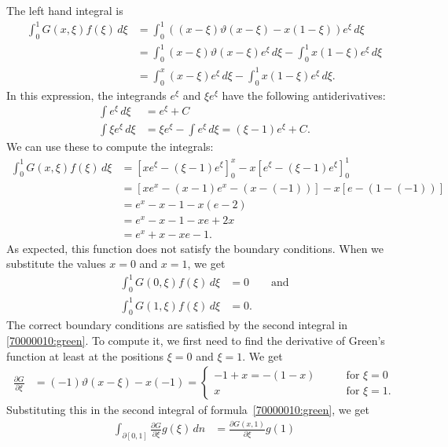 \begin{loesung}
The left hand integral is
\begin{align*}
\int_0^1 G(x,\xi) f(\xi)\,d\xi
&=
\int_0^1 ( (x-\xi)\vartheta(x-\xi) -x(1-\xi)) e^{\xi} \,d\xi
\\
&=
\int_0^1 (x-\xi)\vartheta(x-\xi) e^{\xi} \,d\xi
-
\int_0^1 x(1-\xi) e^{\xi} \,d\xi
\\
&=
\int_0^x (x-\xi) e^{\xi} \,d\xi
-
\int_0^1 x(1-\xi) e^{\xi} \,d\xi.
\end{align*}
In this expression, the integrands
$e^\xi$ and $\xi e^\xi$ have the following antiderivatives:
\begin{align*}
\int e^\xi\,d\xi&=e^\xi + C\\
\int \xi e^\xi\,d\xi&=\xi e^\xi - \int e^\xi\,d\xi = (\xi - 1)e^\xi + C.
\end{align*}
We can use these to compute the integrals:
\begin{align*}
\int_0^1 G(x,\xi) f(\xi)\,d\xi
&=
\left[
xe^\xi -(\xi - 1)e^\xi
\right]_0^x
-
x\left[
e^\xi-(\xi - 1)e^\xi
\right]_0^1
\\
&=
\left[
xe^x-(x-1)e^x
-
(x-(-1))
\right]
-
x
\left[
e - (1-(-1))
\right]
\\
&=
e^x-x-1
-
x(e-2)
\\
&=
e^x-x-1
-xe+2x
\\
&=
e^x+x-xe-1.
\end{align*}
As expected, this function does not satisfy the boundary conditions.
When we substitute the values $x=0$ and $x=1$, we get
\begin{align*}
\int_0^1 G(0,\xi) f(\xi)\,d\xi
&=0\qquad\text{and}
\\
\int_0^1 G(1,\xi) f(\xi)\,d\xi
&=0.
\end{align*}
The correct boundary conditions are satisfied by the second integral
in \eqref{70000010:green}.
To compute it, we first need to find the derivative of Green's function
at least at the positions $\xi=0$ and $\xi=1$.
We get
\begin{align*}
\frac{\partial G}{\partial\xi}
&=(-1)\vartheta(x-\xi) - x(-1)
=\begin{cases}
-1+x=-(1-x)
\qquad&\text{for $\xi=0$}
\\
x
\qquad&\text{for $\xi=1$.}
\end{cases}
\end{align*}
Substituting this in the second integral of formula~\eqref{70000010:green},
we get
\begin{align*}
\int_{\partial[0,1]}\frac{\partial G}{\partial \xi} g(\xi)\,dn
&=
\frac{\partial G(x,1)}{\partial\xi} g(1)

\end{align*}
\end{loesung}
